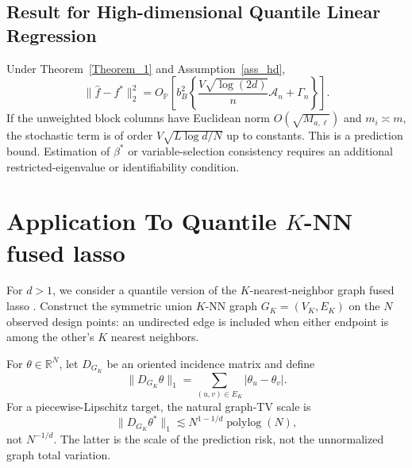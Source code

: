 \documentclass[twoside,11pt]{article}
\newenvironment{revision}{\color{revisionred}}{}
\begin{document}
\subsection{Result for High-dimensional Quantile Linear Regression}
\begin{theorem}\label{thm_hd}
\begin{revision}
Under Theorem~\ref{Theorem_1} and Assumption~\ref{ass_hd},
\begin{equation}
 \|\widehat f-f^*\|_2^2
 =O_{\mathbb P}\left[
 b_B^2\left\{\frac{V\sqrt{\log(2d)}}{n}\mathcal A_n+\Gamma_n\right\}
 \right].                                                     \label{eq:hd_rate_full}
\end{equation}
If the unweighted block columns have Euclidean norm $O(\sqrt{M_{a,\ell}})$ and $m_i\asymp m$, the stochastic term is of order $V\sqrt{L\log d/N}$ up to constants. This is a prediction bound. Estimation of $\beta^*$ or variable-selection consistency requires an additional restricted-eigenvalue or identifiability condition.
\end{revision}
\end{theorem}


\section{Application To Quantile \( K \)-NN fused lasso}

For $d>1$, we consider a quantile version of the $K$-nearest-neighbor graph fused lasso \citep{elmoataz2008nonlocal,ferradans2014regularized,madrid2020adaptive}. Construct the symmetric union $K$-NN graph $G_K=(V_K,E_K)$ on the $N$ observed design points: an undirected edge is included when either endpoint is among the other's $K$ nearest neighbors.

\begin{revision}
For $\theta\in\mathbb R^N$, let $D_{G_K}$ be an oriented incidence matrix and define
\begin{equation}
 \|D_{G_K}\theta\|_1=\sum_{(u,v)\in E_K}|\theta_u-\theta_v|. \label{tv_knn}
\end{equation}
\label{def_knn}
For a piecewise-Lipschitz target, the natural graph-TV scale is
\begin{equation}
 \|D_{G_K}\theta^*\|_1\lesssim N^{1-1/d}\operatorname{polylog}(N), \label{l1_norm_for_knn_reg}
\end{equation}
not $N^{-1/d}$. The latter is the scale of the prediction risk, not the unnormalized graph total variation.
\end{revision}
\end{document}
